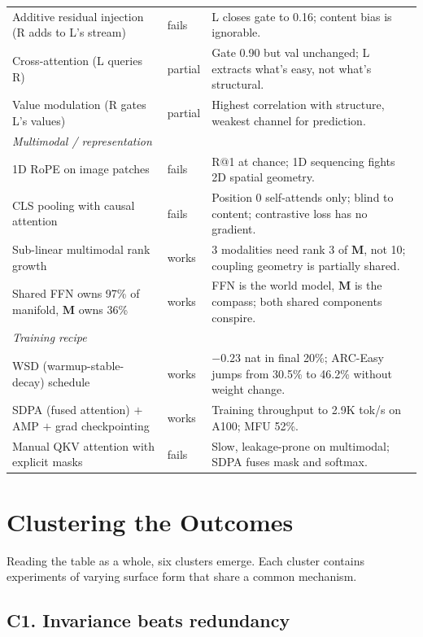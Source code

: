 \documentclass[11pt, a4paper]{article}
\newcommand{\M}{\mathbf{M}}
\newcommand{\rwin}{\cellcolor{rowgreen}}
\newcommand{\rloss}{\cellcolor{rowred}}
\newcommand{\rmixed}{\cellcolor{rowamber}}
\begin{document}
\begin{small}
\begin{longtable}{p{4.2cm} p{1.5cm} p{8.6cm}}
\rloss Additive residual injection (R adds to L's stream) & fails & L closes gate to 0.16; content bias is ignorable. \\
\rmixed Cross-attention (L queries R) & partial & Gate 0.90 but val unchanged; L extracts what's easy, not what's structural. \\
\rmixed Value modulation (R gates L's values) & partial & Highest correlation with structure, weakest channel for prediction. \\
\midrule
\multicolumn{3}{l}{\textit{Multimodal / representation}} \\
\midrule
\rloss 1D RoPE on image patches & fails & R@1 at chance; 1D sequencing fights 2D spatial geometry. \\
\rloss CLS pooling with causal attention & fails & Position 0 self-attends only; blind to content; contrastive loss has no gradient. \\
\rwin Sub-linear multimodal rank growth & works & 3 modalities need rank 3 of $\M$, not 10; coupling geometry is partially shared. \\
\rwin Shared FFN owns 97\% of manifold, $\M$ owns 36\% & works & FFN is the world model, $\M$ is the compass; both shared components conspire. \\
\midrule
\multicolumn{3}{l}{\textit{Training recipe}} \\
\midrule
\rwin WSD (warmup-stable-decay) schedule & works & $-0.23$ nat in final 20\%; ARC-Easy jumps from 30.5\% to 46.2\% without weight change. \\
\rwin SDPA (fused attention) $+$ AMP $+$ grad checkpointing & works & Training throughput to 2.9K tok/s on A100; MFU 52\%. \\
\rloss Manual QKV attention with explicit masks & fails & Slow, leakage-prone on multimodal; SDPA fuses mask and softmax. \\
\bottomrule
\end{longtable}
\end{small}

\section{Clustering the Outcomes}
\label{sec:clusters}

Reading the table as a whole, six clusters emerge. Each cluster contains experiments of varying surface form that share a common mechanism.

\subsection{C1. Invariance beats redundancy}
\end{document}
